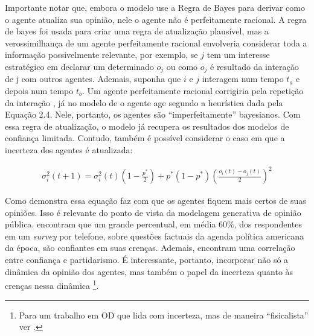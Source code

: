   Importante notar que, embora o modelo use a Regra de Bayes para derivar como o
  agente atualiza sua opinião, nele o agente não é perfeitamente racional. A
  regra de bayes foi usada para criar uma regra de atualização plausível, mas a
  verossimilhança de um agente perfeitamente racional envolveria considerar toda
  a informação possivelmente relevante, por exemplo, se \(j\) tem um interesse
  estratégico em declarar um determinado \(o_j\) ou como \(o_j\) é resultado da
  interação de j com outros agentes. Ademais, suponha que \(i\) e \(j\)
  interagem num tempo \(t_a\) e depois num tempo \(t_b\). Um agente
  perfeitamente racional corrigiria pela repetição da interação
  \cite{acemoglu2011opinion}, já no modelo de  o
  agente age segundo a heurística dada pela Equação 2.4. Nele, portanto, os
  agentes são ``imperfeitamente'' bayesianos. Com essa regra de atualização, o
  modelo já recupera os resultados dos modelos de confiança limitada. Contudo,
  também é possível considerar o caso em que a incerteza dos agentes é
  atualizada:

      \begin{align}
    \sigma_i^2(t+1)
    =
    \sigma_i^2(t)
    (1 - \frac{p^*}{2})
    +
    p^*
    (1-p^*)
    (\frac{o_i(t)-o_j(t)}{2})^2
      \end{align}

      Como demonstra  essa equação faz com que
      os agentes fiquem mais certos de suas opiniões. Isso é relevante do ponto
      de vista da modelagem generativa de opinião pública.
       encontram que um grande
      percentual, em média \( 60 \%\), dos respondentes em um
      \textit{survey} por telefone, sobre questões factuais da agenda política
      americana da época, são confiantes em suas crenças. Ademais, encontram uma
      correlação entre confiança e partidarismo. É interessante, portanto,
      incorporar não só a dinâmica da opinião dos agentes, mas também o papel da
      incerteza quanto às crenças nessa dinâmica \footnote{Para um trabalho em
        OD que lida com incerteza, mas de maneira ``fisicalista'' ver
        .}.


